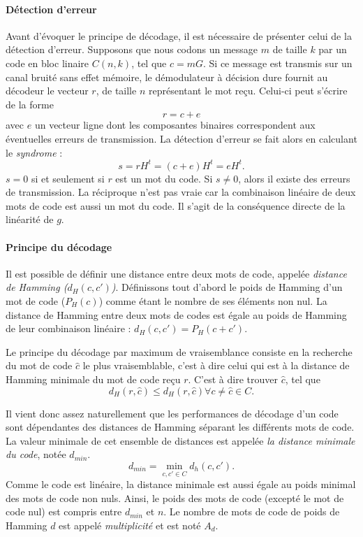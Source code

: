 \paragraph*{Détection d'erreur}
Avant d'évoquer le principe de décodage, il est nécessaire de présenter celui de la détection d'erreur. Supposons que 
nous codons un message $m$ de taille $k$ par un code en bloc linaire $C(n,k)$, tel que $c = mG$. Si ce message est 
transmis sur un canal bruité sans effet mémoire, le démodulateur à décision dure fournit au décodeur le vecteur $r$, de 
taille $n$ représentant le mot reçu. Celui-ci peut s'écrire de la forme \[r=c+e\] avec $e$
un vecteur ligne dont les composantes binaires correspondent aux éventuelles erreurs de transmission. La détection 
d'erreur se fait alors en calculant le \emph{syndrome} : \[s = rH^t = (c+e)H^t = eH^t.\]
$s=0$ si et seulement si $r$  est un mot du code. Si $s \ne 0$, alors il existe des erreurs de transmission. La 
réciproque n'est pas vraie car la combinaison linéaire de deux mots de code est aussi un mot du code. Il s'agit de la conséquence directe de la linéarité de $g$.
\paragraph*{Principe du décodage}
Il est possible de définir une distance entre deux mots de code, appelée \emph{distance de Hamming ($d_H(c, c')$)}. 
Définissons tout d'abord le poids de Hamming d'un mot de code ($P_H(c)$) comme étant le nombre de ses éléments non nul. 
La distance de Hamming entre deux mots de codes est égale au poids de Hamming de leur combinaison linéaire : 
$d_H(c, c') = P_H(c+c')$.

Le principe du décodage par maximum de vraisemblance consiste en la recherche du mot de code $\hat{c}$ le plus 
vraisemblable, c'est à dire celui qui est à la distance de Hamming minimale du mot de code reçu $r$. C'est à dire trouver 
$\hat{c}$, tel que \[d_H(r,\hat{c}) \leq d_H(r,\hat{c}) \forall c \neq \hat{c} \in C.\]

Il vient donc assez naturellement que les performances de décodage d'un code sont dépendantes des distances de Hamming 
séparant les différents mots de code. La valeur minimale de cet ensemble de distances est appelée \emph{la distance minimale du code}, 
notée $d_{min}$. \[d_{min}=\min\limits_{c,c'\in C}d_h(c, c').\] Comme le code est linéaire, la distance minimale 
est aussi égale au poids minimal des mots de code non nuls. Ainsi, le poids des mots de code (excepté le mot 
de code nul) est compris entre $d_{min}$ et $n$. Le nombre de mots de code de poids de Hamming $d$ est appelé 
\emph{multiplicité} et est noté $A_d$.

